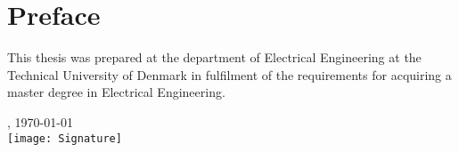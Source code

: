 \chapter{Preface}
This thesis was prepared at the department of Electrical Engineering at the Technical University of Denmark in fulfilment of the requirements for acquiring a master degree in Electrical Engineering.

\vfill

{
\centering
    \thesislocation{}, \today\\[1cm]
    \hspace{3cm}\texttt{[image: Signature]}\\[1cm]
\begin{flushright}
    \thesisauthor{}
\end{flushright}
}
